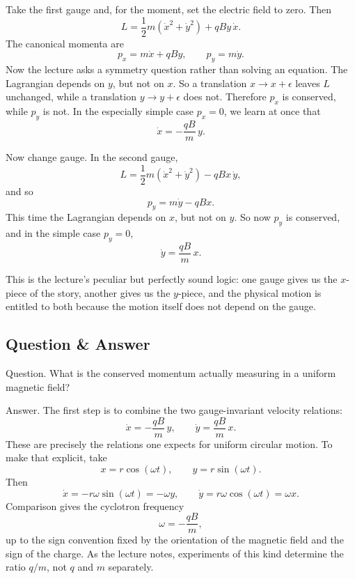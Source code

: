 Take the first gauge and, for the moment, set the electric field to zero. Then
\begin{equation}
L=\frac12 m(\dot x^2+\dot y^2)+qBy\,\dot x.
\end{equation}
The canonical momenta are
\begin{equation}
p_x=m\dot x+qBy,
\qquad
p_y=m\dot y.
\end{equation}
Now the lecture asks a symmetry question rather than solving an equation. The Lagrangian depends on \(y\), but not on \(x\). So a translation \(x\to x+\epsilon\) leaves \(L\) unchanged, while a translation \(y\to y+\epsilon\) does not. Therefore \(p_x\) is conserved, while \(p_y\) is not. In the especially simple case \(p_x=0\), we learn at once that
\begin{equation}
\dot x=-\frac{qB}{m}\,y.
\end{equation}

Now change gauge. In the second gauge,
\begin{equation}
L=\frac12 m(\dot x^2+\dot y^2)-qBx\,\dot y,
\end{equation}
and so
\begin{equation}
p_y=m\dot y-qBx.
\end{equation}
This time the Lagrangian depends on \(x\), but not on \(y\). So now \(p_y\) is conserved, and in the simple case \(p_y=0\),
\begin{equation}
\dot y=\frac{qB}{m}\,x.
\end{equation}

This is the lecture's peculiar but perfectly sound logic: one gauge gives us the \(x\)-piece of the story, another gives us the \(y\)-piece, and the physical motion is entitled to both because the motion itself does not depend on the gauge.

\subsection{Question \& Answer}

Question. What is the conserved momentum actually measuring in a uniform magnetic field?

Answer. The first step is to combine the two gauge-invariant velocity relations:
\begin{equation}
\dot x=-\frac{qB}{m}\,y,
\qquad
\dot y=\frac{qB}{m}\,x.
\end{equation}
These are precisely the relations one expects for uniform circular motion. To make that explicit, take
\begin{equation}
x=r\cos(\omega t),
\qquad
y=r\sin(\omega t).
\end{equation}
Then
\begin{equation}
\dot x=-r\omega\sin(\omega t)=-\omega y,
\qquad
\dot y=r\omega\cos(\omega t)=\omega x.
\end{equation}
Comparison gives the cyclotron frequency
\begin{equation}
\omega=-\frac{qB}{m},
\end{equation}
up to the sign convention fixed by the orientation of the magnetic field and the sign of the charge. As the lecture notes, experiments of this kind determine the ratio \(q/m\), not \(q\) and \(m\) separately.

